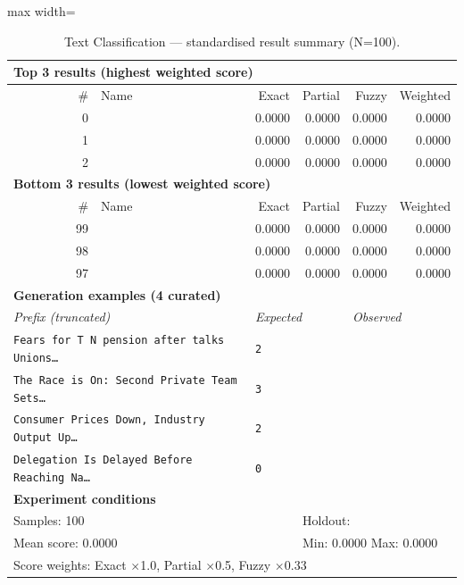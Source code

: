 \begin{table}[htbp]
\centering
\caption{Text Classification — standardised result summary (N=100).}
\label{tab:text_classification_summary}
\begin{adjustbox}{max width=\textwidth}
\begin{tabular}{r p{5cm} r r r r}
\toprule
\multicolumn{6}{l}{\textbf{Top 3 results (highest weighted score)}} \\
\midrule
\# & Name & Exact & Partial & Fuzzy & Weighted \\
\midrule
0 &  & 0.0000 & 0.0000 & 0.0000 & 0.0000 \\
1 &  & 0.0000 & 0.0000 & 0.0000 & 0.0000 \\
2 &  & 0.0000 & 0.0000 & 0.0000 & 0.0000 \\
\midrule
\multicolumn{6}{l}{\textbf{Bottom 3 results (lowest weighted score)}} \\
\midrule
\# & Name & Exact & Partial & Fuzzy & Weighted \\
\midrule
99 &  & 0.0000 & 0.0000 & 0.0000 & 0.0000 \\
98 &  & 0.0000 & 0.0000 & 0.0000 & 0.0000 \\
97 &  & 0.0000 & 0.0000 & 0.0000 & 0.0000 \\
\midrule
\multicolumn{6}{l}{\textbf{Generation examples (4 curated)}} \\
\midrule
\multicolumn{2}{l}{\textit{Prefix (truncated)}} & \multicolumn{2}{l}{\textit{Expected}} & \multicolumn{2}{l}{\textit{Observed}} \\
\midrule
\multicolumn{2}{l}{\texttt{Fears for T N pension after talks Unions\ldots}} & \multicolumn{2}{l}{\texttt{2}} & \multicolumn{2}{l}{\texttt{}} \\
\multicolumn{2}{l}{\texttt{The Race is On: Second Private Team Sets\ldots}} & \multicolumn{2}{l}{\texttt{3}} & \multicolumn{2}{l}{\texttt{}} \\
\multicolumn{2}{l}{\texttt{Consumer Prices Down, Industry Output Up\ldots}} & \multicolumn{2}{l}{\texttt{2}} & \multicolumn{2}{l}{\texttt{}} \\
\multicolumn{2}{l}{\texttt{Delegation Is Delayed Before Reaching Na\ldots}} & \multicolumn{2}{l}{\texttt{0}} & \multicolumn{2}{l}{\texttt{}} \\
\midrule
\multicolumn{6}{l}{\textbf{Experiment conditions}} \\
\midrule
\multicolumn{3}{l}{Samples: 100} & \multicolumn{3}{l}{Holdout: } \\
\multicolumn{3}{l}{Mean score: 0.0000} & \multicolumn{3}{l}{Min: 0.0000 \quad Max: 0.0000} \\
\multicolumn{6}{l}{Score weights: Exact $\times$1.0, Partial $\times$0.5, Fuzzy $\times$0.33} \\
\bottomrule
\end{tabular}
\end{adjustbox}
\end{table}
